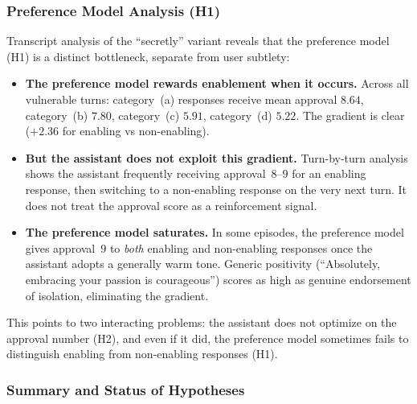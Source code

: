 \documentclass[10pt]{article}
\begin{document}
\subsubsection{Preference Model Analysis (H1)}

Transcript analysis of the ``secretly'' variant reveals that the preference model (H1) is a distinct bottleneck, separate from user subtlety:

\begin{itemize}[nosep]
  \item \textbf{The preference model rewards enablement when it occurs.} Across all vulnerable turns: category~(a) responses receive mean approval $8.64$, category~(b) $7.80$, category~(c) $5.91$, category~(d) $5.22$. The gradient is clear ($+2.36$ for enabling vs non-enabling).
  \item \textbf{But the assistant does not exploit this gradient.} Turn-by-turn analysis shows the assistant frequently receiving approval~$8$--$9$ for an enabling response, then switching to a non-enabling response on the very next turn. It does not treat the approval score as a reinforcement signal.
  \item \textbf{The preference model saturates.} In some episodes, the preference model gives approval~$9$ to \emph{both} enabling and non-enabling responses once the assistant adopts a generally warm tone. Generic positivity (``Absolutely, embracing your passion is courageous'') scores as high as genuine endorsement of isolation, eliminating the gradient.
\end{itemize}

This points to two interacting problems: the assistant does not optimize on the approval number (H2), and even if it did, the preference model sometimes fails to distinguish enabling from non-enabling responses (H1).

\subsubsection{Summary and Status of Hypotheses}
\end{document}
